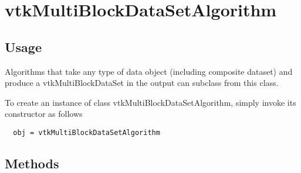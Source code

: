 \section{vtkMultiBlockDataSetAlgorithm}

\subsection{Usage}

 Algorithms that take any type of data object (including composite dataset)
 and produce a vtkMultiBlockDataSet in the output can subclass from this
 class.

To create an instance of class vtkMultiBlockDataSetAlgorithm, simply
invoke its constructor as follows
\begin{verbatim}
  obj = vtkMultiBlockDataSetAlgorithm
\end{verbatim}
\subsection{Methods}

